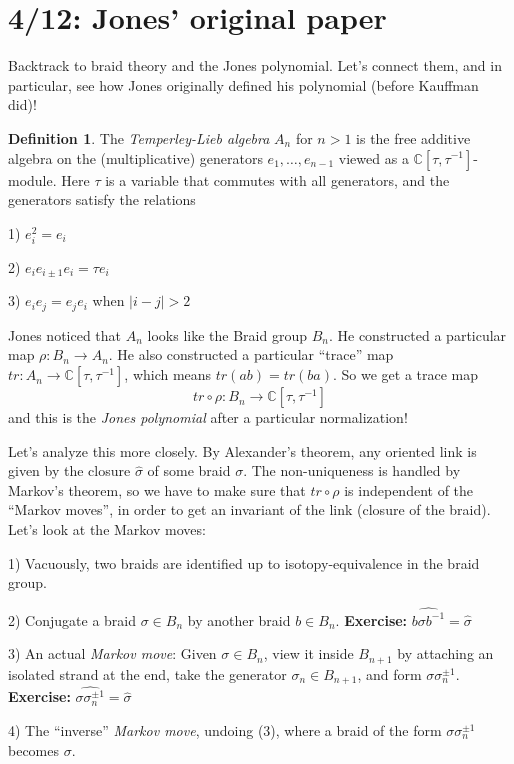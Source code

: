 \documentclass[11pt]{article}
\newcommand{\C}{\mathbb{C}}
\theoremstyle{plain}
\theoremstyle{definition}
\newtheorem{definition}{Definition}
\begin{document}
\clearpage
\section{4/12: Jones' original paper}

Backtrack to braid theory and the Jones polynomial. Let's connect them, and in particular, see how Jones originally defined his polynomial (before Kauffman did)!

\begin{definition}
The \textit{Temperley-Lieb algebra} $A_n$ for $n>1$ is the free additive algebra on the (multiplicative) generators $e_1,\ldots,e_{n-1}$ viewed as a $\C[\tau,\tau^{-1}]$-module. Here $\tau$ is a variable that commutes with all generators, and the generators satisfy the relations

1) $e_i^2=e_i$

2) $e_ie_{i\pm 1}e_i=\tau e_i$

3) $e_ie_j=e_je_i$ when $|i-j|>2$
\end{definition}

Jones noticed that $A_n$ looks like the Braid group $B_n$. He constructed a particular map $\rho:B_n\to A_n$. He also constructed a particular ``trace'' map $tr:A_n\to\C[\tau,\tau^{-1}]$, which means $tr(ab)=tr(ba)$. So we get a trace map
$$tr\circ\rho:B_n\to\C[\tau,\tau^{-1}]$$
and this is the \textit{Jones polynomial} after a particular normalization!

\bigskip
Let's analyze this more closely. By Alexander's theorem, any oriented link is given by the closure $\hat\sigma$ of some braid $\sigma$. The non-uniqueness is handled by Markov's theorem, so we have to make sure that $tr\circ\rho$ is independent of the ``Markov moves'', in order to get an invariant of the link (closure of the braid). Let's look at the Markov moves:

1) Vacuously, two braids are identified up to isotopy-equivalence in the braid group.

2) Conjugate a braid $\sigma\in B_n$ by another braid $b\in B_n$. \textbf{Exercise:} $\widehat{b\sigma b^{-1}}=\hat\sigma$

3) An actual \textit{Markov move}: Given $\sigma\in B_n$, view it inside $B_{n+1}$ by attaching an isolated strand at the end, take the generator $\sigma_n\in B_{n+1}$, and form $\sigma\sigma_n^{\pm 1}$. \textbf{Exercise:} $\widehat{\sigma\sigma_n^{\pm 1}}=\hat\sigma$

4) The ``inverse'' \textit{Markov move}, undoing (3), where a braid of the form $\sigma\sigma_n^{\pm 1}$ becomes $\sigma$.
\end{document}
